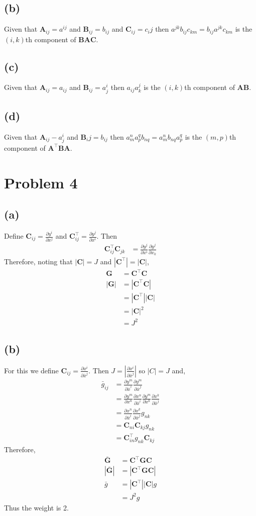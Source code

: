 \documentclass[12pt]{article}
\newcommand{\eq}[1]{\begin{align*}#1\end{align*}}
\newcommand{\p}[2]{\frac{\partial#1}{\partial#2}}
\newcommand{\co}[2]{\p{x^#1}{\bar{x}^#2}}
\newcommand{\coy}[2]{\p{y^#1}{\bar{x}^#2}}
\newcommand{\cony}[2]{\p{y^#1}{x^#2}}
\begin{document}
\subsection*{(b)} Given that $\bm{A}_{ij} = a^{ij}$ and $\bm{B}_{ij} = b_{ij}$ and $\bm{C}_{ij} = c_ij$ then $a^{jk}b_{ij}c_{km} = b_{ij}a^{jk}c_{km}$ is the $(i, k)$th component of $\bm{BAC}$.
\subsection*{(c)} Given that $\bm{A}_{ij} = a_{ij}$ and $\bm{B}_{ij} = a^i_j$ then $a_{ij}a_k^j$ is the $(i, k)$th component of $\bm{AB}$.
\subsection*{(d)} Given that $\bm{A}_{ij} - a_j^i$ and $\bm{B}_ij = b_{ij}$ then $a_m^na_p^qb_{nq} = a_m^nb_{nq}a_p^q$ is the $(m, p)$th component of $\bm{A}^\top\bm{BA}$.
\section*{Problem 4}
\subsection*{(a)} Define $\bm{C}_{ij} = \p{y^i}{x^j}$ and $\bm{C}^\top_{ij} = \p{y^j}{x^i}$. Then
\eq{
	\bm{C}_{ij}^\top\bm{C}_{jk} &= \p{y^j}{x^i}\p{y^j}{x_k}
}
Therefore, noting that $|\bm{C}| = J$ and $|\bm{C}^\top| = |\bm{C}|$,
\eq{
	\bm{G} &= \bm{C}^\top\bm{C}\\
	|\bm{G}| &= |\bm{C}^\top\bm{C}|\\
	&= |\bm{C}^\top||\bm{C}|\\
	&= |\bm{C}|^2\\
	&= J^2
}
\subsection*{(b)} For this we define $\bm{C}_{ij} = \co{i}{j}$. Then $J = |\co{i}{j}|$ so $|C| = J$ and,
\eq{
	\bar{g}_{ij} &= \coy{m}{i}\coy{m}{j}\\
	&= \cony{m}{n}\co{n}{i}\cony{m}{k}\co{k}{j}\\
	&= \co{n}{i}\co{k}{j} g_{nk}\\
	&= \bm{C}_{ni}\bm{C}_{kj}g_{nk}\\
	&= \bm{C}_{in}^\top g_{nk} \bm{C}_{kj}
}
Therefore,
\eq{
	\bar{\bm{G}} &= \bm{C}^\top \bm{G} \bm{C}\\
	|\bar{\bm{G}}| &= |\bm{C}^\top \bm{G} \bm{C}|\\
	\bar{g} &= |\bm{C}^\top| |\bm{C}| g\\
	&= J^2 g
}
Thus the weight is 2.
\end{document}

